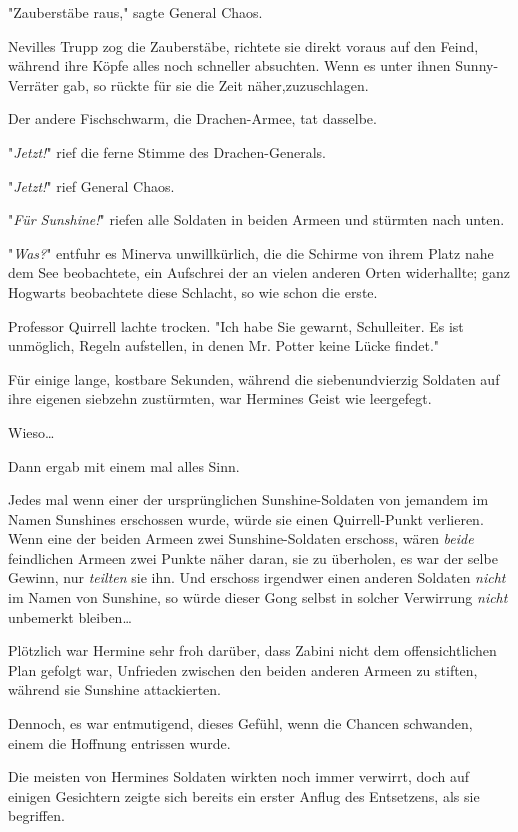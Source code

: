 {"Zauberstäbe raus," sagte General Chaos.

Nevilles Trupp zog die Zauberstäbe, richtete sie direkt voraus auf den Feind, während ihre Köpfe alles noch schneller absuchten. Wenn es unter ihnen Sunny-Verräter gab, so rückte für sie die Zeit näher,zuzuschlagen.

Der andere Fischschwarm, die Drachen-Armee, tat dasselbe.

"\emph{Jetzt!}" rief die ferne Stimme des Drachen-Generals.

"\emph{Jetzt!}" rief General Chaos.

"\emph{Für Sunshine!}" riefen alle Soldaten in beiden Armeen und stürmten nach unten.

\later

"\emph{Was?}" entfuhr es Minerva unwillkürlich, die die Schirme von ihrem Platz nahe dem See beobachtete, ein Aufschrei der an vielen anderen Orten widerhallte; ganz Hogwarts beobachtete diese Schlacht, so wie schon die erste.

Professor Quirrell lachte trocken. "Ich habe Sie gewarnt, Schulleiter. Es ist unmöglich, Regeln aufstellen, in denen Mr. Potter keine Lücke findet."

\later

Für einige lange, kostbare Sekunden, während die siebenundvierzig Soldaten auf ihre eigenen siebzehn zustürmten, war Hermines Geist wie leergefegt.

Wieso…

Dann ergab mit einem mal alles Sinn.

Jedes mal wenn einer der ursprünglichen Sunshine-Soldaten von jemandem im Namen Sunshines erschossen wurde, würde sie einen Quirrell-Punkt verlieren. Wenn eine der beiden Armeen zwei Sunshine-Soldaten erschoss, wären \emph{beide} feindlichen Armeen zwei Punkte näher daran, sie zu überholen, es war der selbe Gewinn, nur \emph{teilten} sie ihn. Und erschoss irgendwer einen anderen Soldaten \emph{nicht} im Namen von Sunshine, so würde dieser Gong selbst in solcher Verwirrung \emph{nicht} unbemerkt bleiben…

Plötzlich war Hermine sehr froh darüber, dass Zabini nicht dem offensichtlichen Plan gefolgt war, Unfrieden zwischen den beiden anderen Armeen zu stiften, während sie Sunshine attackierten.

Dennoch, es war entmutigend, dieses Gefühl, wenn die Chancen schwanden, einem die Hoffnung entrissen wurde.

Die meisten von Hermines Soldaten wirkten noch immer verwirrt, doch auf einigen Gesichtern zeigte sich bereits ein erster Anflug des Entsetzens, als sie begriffen.

}
